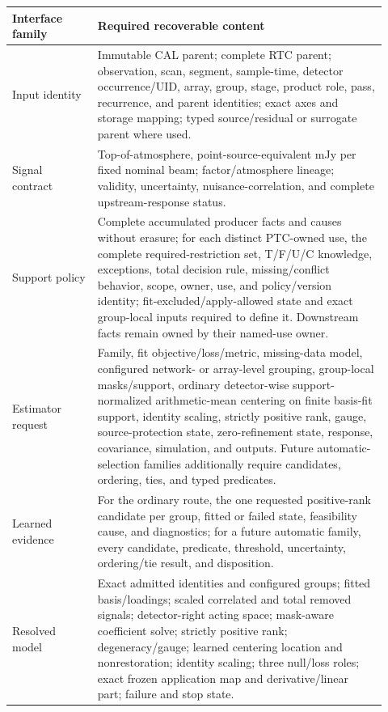 \documentclass[10pt]{article}
\begin{document}
\begin{longtable}{>{\raggedright\arraybackslash}p{0.21\linewidth}
                  >{\raggedright\arraybackslash}p{0.71\linewidth}}
\toprule
Interface family & Required recoverable content \\
\midrule
\endhead
Input identity & Immutable CAL parent; complete RTC parent; observation, scan, segment, sample-time, detector occurrence/UID, array, group, stage, product role, pass, recurrence, and parent identities; exact axes and storage mapping; typed source/residual or surrogate parent where used.\\
Signal contract & Top-of-atmosphere, point-source-equivalent mJy per fixed nominal beam; factor/atmosphere lineage; validity, uncertainty, nuisance-correlation, and complete upstream-response status.\\
Support policy & Complete accumulated producer facts and causes without erasure; for each distinct PTC-owned use, the complete required-restriction set, T/F/U/C knowledge, exceptions, total decision rule, missing/conflict behavior, scope, owner, use, and policy/version identity; fit-excluded/apply-allowed state and exact group-local inputs required to define it. Downstream facts remain owned by their named-use owner.\\
Estimator request & Family, fit objective/loss/metric, missing-data model, configured network- or array-level grouping, group-local masks/support, ordinary detector-wise support-normalized arithmetic-mean centering on finite basis-fit support, identity scaling, strictly positive rank, gauge, source-protection state, zero-refinement state, response, covariance, simulation, and outputs. Future automatic-selection families additionally require candidates, ordering, ties, and typed predicates.\\
Learned evidence & For the ordinary route, the one requested positive-rank candidate per group, fitted or failed state, feasibility cause, and diagnostics; for a future automatic family, every candidate, predicate, threshold, uncertainty, ordering/tie result, and disposition.\\
Resolved model & Exact admitted identities and configured groups; fitted basis/loadings; scaled correlated and total removed signals; detector-right acting space; mask-aware coefficient solve; strictly positive rank; degeneracy/gauge; learned centering location and nonrestoration; identity scaling; three null/loss roles; exact frozen application map and derivative/linear part; failure and stop state.\\

\end{longtable}
\end{document}
